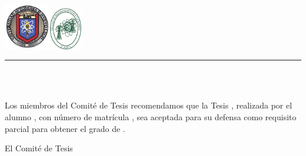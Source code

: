 {\renewcommand{\baselinestretch}{1.1}\selectfont
\begin{center}\vspace*{-25mm}\hspace*{-10mm}
\begin{minipage}{170.5mm}
\hspace{-1.5mm}\includegraphics[height=20mm]{uanl}\hfill{}\hbox{\includegraphics[height=18.5mm]{fime}}
\hrule\vspace{0.5mm}
\scalebox{.5}{\MakeUppercase{\uanl}}\hfill\scalebox{.5}{\MakeUppercase{\fime}}\medskip
\end{minipage}
\vskip4mm{\sc\large\uanl\\\fime\\[3pt]\depg}\vskip6mm
\end{center}


\vskip 2mm

Los miembros del Comité de Tesis recomendamos que la Tesis \textit{\titulo}, realizada por el alumno \autor, con número de matrícula \matricula, sea aceptada para su defensa como requisito parcial para obtener el grado de \grado\orientacion .
\ifdoctorado{\vskip 10mm}\else{\vskip 8mm}\fi

\begin{center}
El Comité de Tesis\\
\ifdoctorado{\vskip 15mm}\else{\vskip 25mm}\fi


\end{center}}
